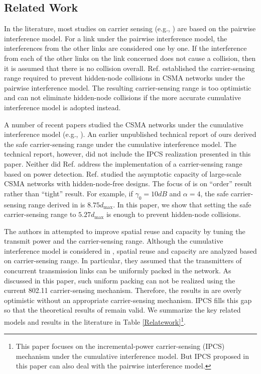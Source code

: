 \documentclass[conference]{IEEEtran}
\begin{document}
\subsection{Related Work}\label{relatedwork}




In the literature, most studies on carrier sensing (e.g.,
\cite{KXu,LiBin,PCNg,libinhdfvcs,SXu,Vasan}) are based on the
pairwise interference model. For a link under the pairwise
interference model, the interferences from the other links are
considered one by one. If the interference from each of the other
links on the link concerned does not cause a collision, then it is
assumed that there is no collision overall. Ref. \cite{LiBin}
established the carrier-sensing range required to prevent
hidden-node collisions in CSMA networks under the pairwise
interference model. The resulting carrier-sensing range is too
optimistic and can not eliminate hidden-node collisions if the more
accurate cumulative interference model is adopted instead.

A number of recent papers studied the CSMA networks under the
cumulative interference model (e.g.,
\cite{chichau,TaeSuk,TingYu,Liqun}). An earlier unpublished
technical report of ours \cite{Liqun} derived the safe
carrier-sensing range under the cumulative interference model. The
technical report, however, did not include the IPCS realization
presented in this paper. Neither did Ref.
\cite{chichau,TaeSuk,TingYu} address the implementation of a
carrier-sensing range based on power detection. Ref. \cite{chichau}
studied the asymptotic capacity of large-scale CSMA networks with
hidden-node-free designs. The focus of \cite{chichau} is on
``order'' result rather than ``tight'' result. For example, if
$\gamma_0=10dB$ and $\alpha=4$, the safe carrier-sensing range
derived in \cite{chichau} is $8.75d_{\max}$. In this paper, we show
that setting the safe carrier-sensing range to $5.27d_{\max}$ is
enough to prevent hidden-node collisions.

The authors in \cite{TaeSuk,TingYu} attempted to improve spatial
reuse and capacity by tuning the transmit power and the
carrier-sensing range. Although the cumulative interference model is
considered in \cite{TaeSuk,TingYu}, spatial reuse and capacity are
analyzed based on carrier-sensing range. In particular, they assumed
that the transmitters of concurrent transmission links can be
uniformly packed in the network. As discussed in this paper, such
uniform packing can not be realized using the current 802.11
carrier-sensing mechanism. Therefore, the results in
\cite{TaeSuk,TingYu} are overly optimistic without an appropriate
carrier-sensing mechanism. IPCS f\/ills this gap so that the
theoretical results of \cite{TaeSuk,TingYu} remain valid. We
summarize the key related models and results in the literature in
Table \ref{Relatework}\footnote{This paper focuses on the
incremental-power carrier-sensing (IPCS) mechanism under the
cumulative interference model. But IPCS proposed in this paper can
also deal with the pairwise interference model.}.
\end{document}
